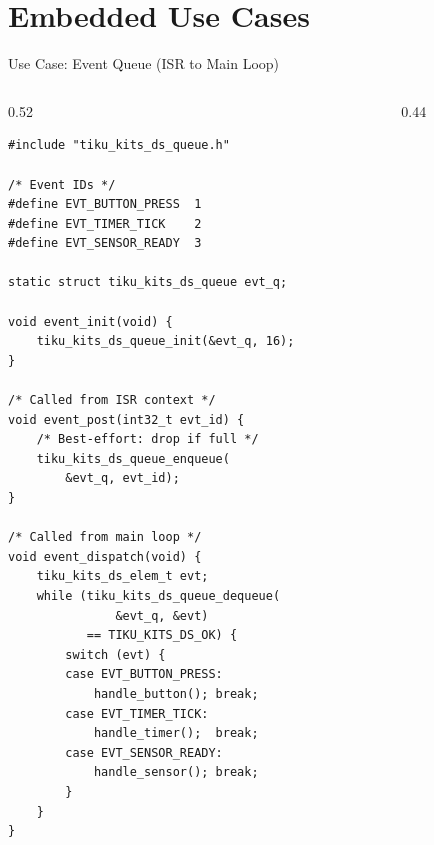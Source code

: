 \documentclass[aspectratio=169, 10pt]{beamer}
\begin{document}
\section{Embedded Use Cases}

\begin{frame}[fragile]{Use Case: Event Queue (ISR to Main Loop)}
\begin{columns}[T]
\begin{column}{0.52\textwidth}
\begin{lstlisting}[style=cstyle,
  title={ISR posts events, main loop dispatches}]
#include "tiku_kits_ds_queue.h"

/* Event IDs */
#define EVT_BUTTON_PRESS  1
#define EVT_TIMER_TICK    2
#define EVT_SENSOR_READY  3

static struct tiku_kits_ds_queue evt_q;

void event_init(void) {
    tiku_kits_ds_queue_init(&evt_q, 16);
}

/* Called from ISR context */
void event_post(int32_t evt_id) {
    /* Best-effort: drop if full */
    tiku_kits_ds_queue_enqueue(
        &evt_q, evt_id);
}

/* Called from main loop */
void event_dispatch(void) {
    tiku_kits_ds_elem_t evt;
    while (tiku_kits_ds_queue_dequeue(
               &evt_q, &evt)
           == TIKU_KITS_DS_OK) {
        switch (evt) {
        case EVT_BUTTON_PRESS:
            handle_button(); break;
        case EVT_TIMER_TICK:
            handle_timer();  break;
        case EVT_SENSOR_READY:
            handle_sensor(); break;
        }
    }
}
\end{lstlisting}
\end{column}

\begin{column}{0.44\textwidth}
\begin{center}
\end{center}
\end{column}
\end{columns}
\end{frame}
\end{document}
